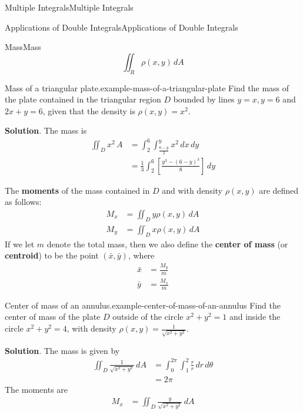 \documentclass[10pt,]{book}
\newcommand{\terminology}[1]{\textbf{#1}}
\numberwithin{equation}{section}
\begin{document}
\begin{chapterptx}{Multiple Integrals}{}{Multiple Integrals}{}{}
\begin{sectionptx}{Applications of Double Integrals}{}{Applications of Double Integrals}{}{}
\begin{subsectionptx}{Mass}{}{Mass}{}{}
\begin{equation*}
\iint_{R}\rho(x,y)\,dA
\end{equation*}
%
\begin{example}{Mass of a triangular plate.}{example-mass-of-a-triangular-plate}%
\hypertarget{p-1280}{}%
Find the mass of the plate contained in the triangular region \(D\) bounded by lines \(y=x, y = 6\) and \(2x+y = 6\), given that the density is \(\rho(x,y) = x^{2}\).%
\par\smallskip%
\noindent\textbf{Solution}.\hypertarget{solution-204}{}\quad%
\hypertarget{p-1281}{}%
The mass is%
\begin{align*}
\iint_{D}x^{2}\,A & =  \int_{2}^{6}\int_{\frac{6-y}{2}}^{y}x^{2}\,dx\,dy\\
& = \frac{1}{3}\int_{2}^{6}\left[\frac{y^{3} - (6-y)^{3}}{8}\right]\,dy 
\end{align*}
%
\end{example}
\hypertarget{p-1282}{}%
The \terminology{moments} of the mass contained in \(D\) and with density \(\rho(x,y)\) are defined as follows:%
\begin{align*}
M_{x} & = \iint_{D}y\rho(x,y)\,dA \\
M_{y} & = \iint_{D}x\rho(x,y)\,dA 
\end{align*}
If we let \(m\) denote the total mass, then we also define the \terminology{center of mass} (or \terminology{centroid}) to be the point \((\bar{x},\bar{y})\), where%
\begin{align*}
\bar{x} & = \frac{M_{y}}{m} \\
\bar{y} & = \frac{M_{x}}{m} 
\end{align*}
%
\begin{example}{Center of mass of an annulus.}{example-center-of-mass-of-an-annulus}%
\hypertarget{p-1283}{}%
Find the center of mass of the plate \(D\) outside of the circle \(x^{2}+y^{2} = 1\) and inside the circle \(x^{2} + y^{2} = 4\), with density \(\rho(x,y) = \frac{1}{\sqrt{x^{2} + y^{2}}}\).%
\par\smallskip%
\noindent\textbf{Solution}.\hypertarget{solution-205}{}\quad%
\hypertarget{p-1284}{}%
The mass is given by%
\begin{align*}
\iint_{D} \frac{1}{\sqrt{x^{2}+y^{2}}}\,dA & = \int_{0}^{2\pi}\int_{1}^{2}\frac{r}{r}\,dr\,d\theta \\
& = 2\pi 
\end{align*}
The moments are%
\begin{align*}
M_{x} & = \iint_{D}\frac{y}{\sqrt{x^{2} + y^{2}}}\,dA \\

\end{align*}
\end{example}
\end{subsectionptx}
\end{sectionptx}
\end{chapterptx}
\end{document}
